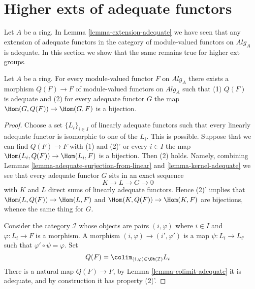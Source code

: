 \section{Higher exts of adequate functors}
\label{section-higher-ext}

\noindent
Let $A$ be a ring. In
Lemma \ref{lemma-extension-adequate}
we have seen that any extension of adequate functors in the category
of module-valued functors on $\textit{Alg}_A$ is adequate. In this
section we show that the same remains true for higher ext groups.

\begin{lemma}
\label{lemma-adjoint}
Let $A$ be a ring.
For every module-valued functor $F$ on $\textit{Alg}_A$
there exists a morphism $Q(F) \to F$ of module-valued functors on
$\textit{Alg}_A$ such that (1) $Q(F)$ is adequate and (2) for every
adequate functor $G$ the map $\Hom(G, Q(F)) \to \Hom(G, F)$
is a bijection.
\end{lemma}

\begin{proof}
Choose a set $\{L_i\}_{i \in I}$ of linearly adequate functors such that
every linearly adequate functor is isomorphic to one of the $L_i$.
This is possible. Suppose that we can find $Q(F) \to F$ with (1) and
(2)' or every $i \in I$ the map $\Hom(L_i, Q(F)) \to \Hom(L_i, F)$
is a bijection. Then (2) holds. Namely, combining
Lemmas \ref{lemma-adequate-surjection-from-linear} and
\ref{lemma-kernel-adequate}
we see that every adequate functor $G$ sits in an exact sequence
$$
K \to L \to G \to 0
$$
with $K$ and $L$ direct sums of linearly adequate functors. Hence (2)'
implies that
$\Hom(L, Q(F)) \to \Hom(L, F)$
and
$\Hom(K, Q(F)) \to \Hom(K, F)$
are bijections, whence the same thing for $G$.

\medskip\noindent
Consider the category $\mathcal{I}$ whose objects are pairs
$(i, \varphi)$ where $i \in I$ and $\varphi : L_i \to F$ is a morphism.
A morphism $(i, \varphi) \to (i', \varphi')$ is a map
$\psi : L_i \to L_{i'}$ such that $\varphi' \circ \psi = \varphi$.
Set
$$
Q(F) = \colim_{(i, \varphi) \in \Ob(\mathcal{I})} L_i
$$
There is a natural map $Q(F) \to F$, by
Lemma \ref{lemma-colimit-adequate}
it is adequate, and by construction it has property (2)'.
\end{proof}

